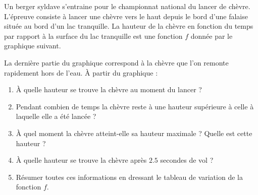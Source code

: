 
    Un berger syldave s'entraine pour le championnat national du lancer de chèvre. L'épreuve consiste à lancer une chèvre vers le haut depuis le bord d'une falaise située au bord d'un lac tranquille. La hauteur de la chèvre en fonction du temps par rapport à la surface du lac tranquille est une fonction \( f\) donnée par le graphique suivant.

    \begin{center}
        
    \end{center}
    La dernière partie du graphique correspond à la chèvre que l'on remonte rapidement hors de l'eau.
    À partir du graphique :
    \begin{enumerate}
        \item
            À quelle hauteur se trouve la chèvre au moment du lancer ?
        \item
            Pendant combien de temps la chèvre reste à une hauteur supérieure à celle à laquelle elle a été lancée ?
        \item
            À quel moment la chèvre atteint-elle sa hauteur maximale ? Quelle est cette hauteur ?
        \item
            À quelle hauteur se trouve la chèvre après \( 2.5\) secondes de vol ?
        \item
            Résumer toutes ces informations en dressant le tableau de variation de la fonction \( f\).
    \end{enumerate}
